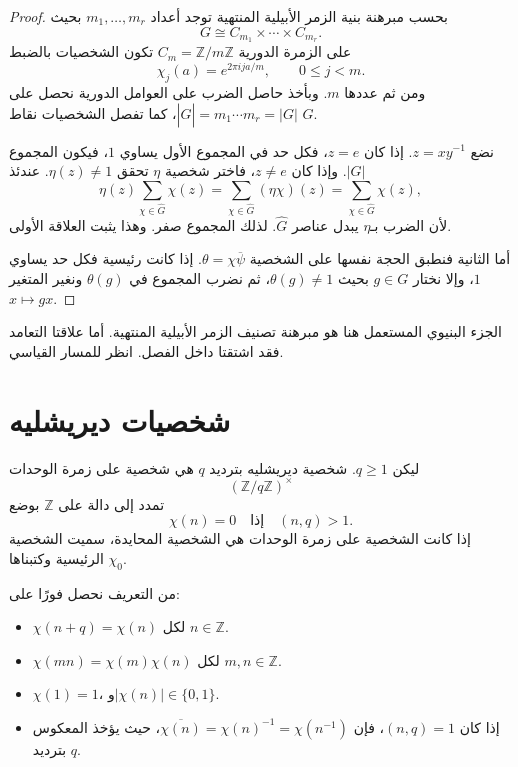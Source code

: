 \begin{proof}
بحسب مبرهنة بنية الزمر الأبيلية المنتهية توجد أعداد
\(m_1,\ldots,m_r\) بحيث
\[
G\cong C_{m_1}\times\cdots\times C_{m_r}.
\]
على الزمرة الدورية \(C_m=\mathbb Z/m\mathbb Z\) تكون الشخصيات بالضبط
\[
\chi_j(a)=e^{2\pi ija/m},
\qquad 0\leq j<m.
\]
ومن ثم عددها \(m\). وبأخذ حاصل الضرب على العوامل الدورية نحصل على
\(|\widehat G|=m_1\cdots m_r=|G|\)، كما تفصل الشخصيات نقاط \(G\).

نضع \(z=xy^{-1}\). إذا كان \(z=e\)، فكل حد في المجموع الأول يساوي
\(1\)، فيكون المجموع \(|G|\). وإذا كان \(z\ne e\)، فاختر شخصية
\(\eta\) تحقق \(\eta(z)\ne1\). عندئذ
\[
\eta(z)\sum_{\chi\in\widehat G}\chi(z)
=
\sum_{\chi\in\widehat G}(\eta\chi)(z)
=
\sum_{\chi\in\widehat G}\chi(z),
\]
لأن الضرب بـ\(\eta\) يبدل عناصر \(\widehat G\). لذلك المجموع صفر.
وهذا يثبت العلاقة الأولى.

أما الثانية فنطبق الحجة نفسها على الشخصية
\(\theta=\chi\overline\psi\). إذا كانت رئيسية فكل حد يساوي \(1\)،
وإلا نختار \(g\in G\) بحيث \(\theta(g)\ne1\)، ثم نضرب المجموع في
\(\theta(g)\) ونغير المتغير \(x\mapsto gx\).
\end{proof}

\begin{remark}
الجزء البنيوي المستعمل هنا هو مبرهنة تصنيف الزمر الأبيلية المنتهية. أما
علاقتا التعامد فقد اشتقتا داخل الفصل. انظر
\cite{Apostol1976,MontgomeryVaughan2007} للمسار القياسي.
\end{remark}

\section{شخصيات ديريشليه}

\begin{definition}
ليكن \(q\geq1\). شخصية ديريشليه بترديد \(q\) هي شخصية على زمرة الوحدات
\[
(\mathbb Z/q\mathbb Z)^{\times}
\]
تمدد إلى دالة على \(\mathbb Z\) بوضع
\[
\chi(n)=0
\quad\text{إذا}\quad (n,q)>1.
\]
إذا كانت الشخصية على زمرة الوحدات هي الشخصية المحايدة، سميت الشخصية
الرئيسية وكتبناها \(\chi_0\).
\end{definition}

من التعريف نحصل فورًا على:

\begin{itemize}
  \item \(\chi(n+q)=\chi(n)\) لكل \(n\in\mathbb Z\).
  \item \(\chi(mn)=\chi(m)\chi(n)\) لكل \(m,n\in\mathbb Z\).
  \item \(\chi(1)=1\)، و\(|\chi(n)|\in\{0,1\}\).
  \item إذا كان \((n,q)=1\)، فإن
  \(\overline{\chi(n)}=\chi(n)^{-1}=\chi(n^{-1})\)، حيث يؤخذ
  المعكوس بترديد \(q\).
\end{itemize}

